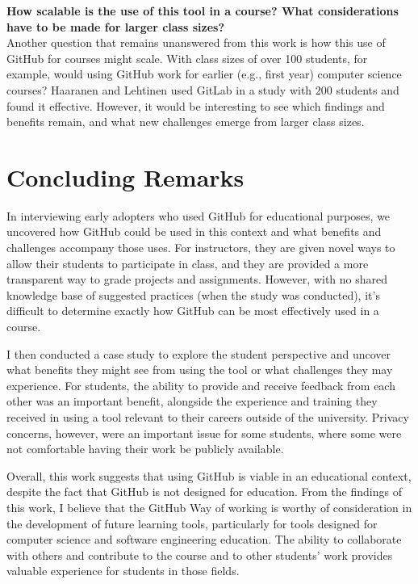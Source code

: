 \textbf{How scalable is the use of this tool in a course? What considerations have to be made for larger class sizes?} \\
Another question that remains unanswered from this work is how this use of GitHub for courses might scale. With class sizes of over 100 students, for example, would using GitHub work for earlier (e.g., first year) computer science courses? Haaranen and Lehtinen \cite{haaranen2015teaching} used GitLab in a study with 200 students and found it effective. However, it would be interesting to see which findings and benefits remain, and what new challenges emerge from larger class sizes.

\section{Concluding Remarks}
In interviewing early adopters who used GitHub for educational purposes, we uncovered how GitHub could be used in this context and what benefits and challenges accompany those uses. For instructors, they are given novel ways to allow their students to participate in class, and they are provided a more transparent way to grade projects and assignments. However, with no shared knowledge base of suggested practices (when the study was conducted), it's difficult to determine exactly how GitHub can be most effectively used in a course.

I then conducted a case study to explore the student perspective and uncover what benefits they might see from using the tool or what challenges they may experience. For students, the ability to provide and receive feedback from each other was an important benefit, alongside the experience and training they received in using a tool relevant to their careers outside of the university. Privacy concerns, however, were an important issue for some students, where some were not comfortable having their work be publicly available.

Overall, this work suggests that using GitHub is viable in an educational context, despite the fact that GitHub is not designed for education. From the findings of this work, I believe that the GitHub Way of working is worthy of consideration in the development of future learning tools, particularly for tools designed for computer science and software engineering education. The ability to collaborate with others and contribute to the course and to other students' work provides valuable experience for students in those fields.
